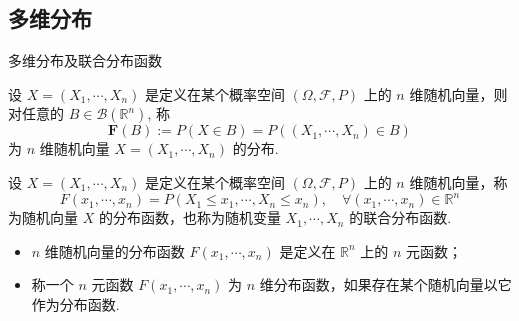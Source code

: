 \subsection{多维分布}
\begin{frame}{多维分布及联合分布函数}
		\begin{defi}[多维分布]
		设 $X=\left (X_1,\cdots ,X_n \right) $ 是定义在某个概率空间 $\left ( \varOmega ,\mathcal{F},P   \right) $ 上的 $n$ 维随机向量，则对任意的 $B\in\mathcal{B}(\mathbb{R}^n)$, 称
		$$
		\mathbf{F}(B):=P(X\in B)=P((X_1,\cdots, X_n)\in B)
		$$ 为 $n$ 维随机向量 $X=\left (X_1,\cdots ,X_n \right)$ 的分布. %
	\end{defi}

\pause

	\begin{defi}[分布函数或联合分布函数]
		设 $X=\left (X_1,\cdots ,X_n \right) $ 是定义在某个概率空间 $\left ( \varOmega ,\mathcal{F},P \right) $ 上的 $n$ 维随机向量，称
		$$
		F\left( x_1,\cdots ,x_n \right) =P\left( X_1\leqslant x_1,\cdots ,X_n\leqslant x_n \right) ,\quad \forall \left( x_1,\cdots ,x_n \right) \in \mathbb{R}^n
		$$ 为随机向量 $X$ 的分布函数，也称为随机变量 $ X_1,\cdots,X_n$ 的联合分布函数.
	\end{defi}
\pause
\begin{rmk}
\begin{itemize}[<+-|alert@+>]
	\item $n$ 维随机向量的分布函数 $F (x_1,\cdots,x_n)$ 是定义在 $\mathbb{R}^n$ 上的 $n$ 元函数；
	\item 称一个 $n$ 元函数 $F (x_1,\cdots,x_n)$ 为 $n$ 维分布函数，如果存在某个随机向量以它作为分布函数.
\end{itemize}
\end{rmk}

\end{frame}

